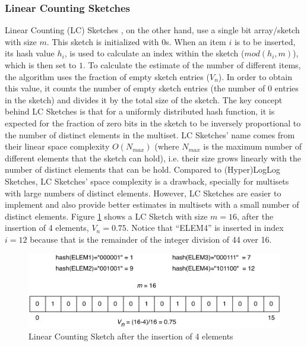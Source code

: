 \subsubsection{Linear Counting Sketches}
\label{sec:line-count-sketch}
Linear Counting (LC) Sketches \cite{Whang:1990uh}, on the other hand,
use a single bit array/sketch with size $m$. This sketch is
initialized with $0$s. When an item $i$ is to be inserted, its hash
value $h_i$, is used to calculate an index within the sketch
($mod(h_i,m)$), which is then set to $1$. To calculate the estimate of
the number of different items, the algorithm uses the fraction of
empty sketch entries ($V_n$). In order to obtain this value, it counts
the number of empty sketch entries (the number of $0$ entries in the
sketch) and divides it by the total size of the sketch. The key
concept behind LC Sketches is that for a uniformly distributed hash
function, it is expected for the fraction of zero bits in the sketch
to be inversely proportional to the number of distinct elements in the
multiset. LC Sketches' name comes from their linear space complexity
$O(N_{max})$ (where $N_{max}$ is the maximum number of different
elements that the sketch can hold), i.e. their size grows linearly
with the number of distinct elements that can be hold. Compared to
(Hyper)LogLog Sketches, LC Sketches' space complexity is a drawback,
specially for multisets with large numbers of distinct elements.
However, LC Sketches are easier to implement and also provide better
estimates in multisets with a small number of distinct elements.
Figure \ref{fig:lc_sketches} shows a LC Sketch with size $m=16$, after
the insertion of 4 elements, $V_n=0.75$. Notice that ``ELEM4'' is
inserted in index $i=12$ because that is the remainder of the integer
division of 44 over 16.

\begin{figure}[htb]
  \centering
  \includegraphics[width=\textwidth]{images/lc_sketch.pdf}
  \caption{Linear Counting Sketch after the insertion of 4 elements}
  \label{fig:lc_sketches}
\end{figure}

